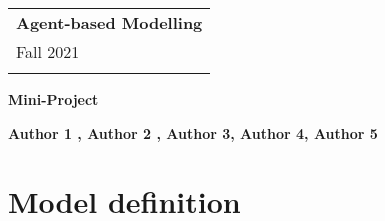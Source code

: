 \documentclass[a4paper,12pt]{article} %
\begin{document}



\thispagestyle{empty} %

\begin{tabular}{p{15.5cm}} %

{\large \bf Agent-based Modelling} \\
Fall 2021  \\
\hline %
\\
\end{tabular} %

\vspace*{0.3cm} %

\begin{center} %
	{\Large \bf Mini-Project} %
	\vspace{2mm}
	
	{\bf Author 1 , Author 2 , Author 3, Author 4, Author 5 } %
		
\end{center}  

\vspace{0.4cm}

\section{Model definition}
\end{document}

